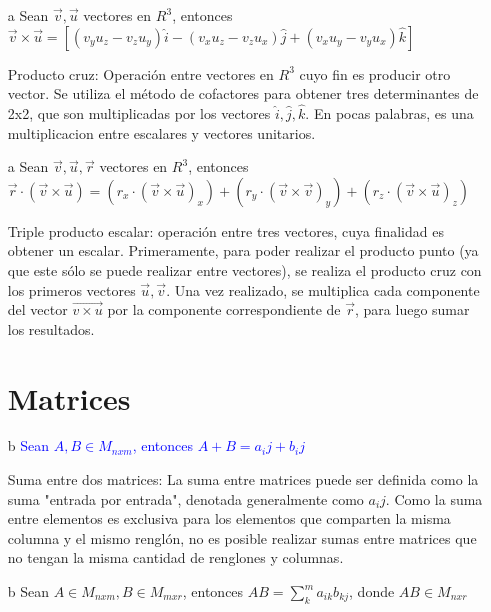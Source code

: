 \documentclass[letterpaper, 12pt]{article}
\begin{document}
\begin{itemize}
    \item[a] Sean $\vec v, \vec u$ vectores en $R^3$, entonces $\vec v \times \vec u = [(v_yu_z - v_zu_y)\hat{i} -(v_xu_z - v_zu_x)\hat{j} + (v_xu_y - v_yu_x)\hat{k}]$ \newline

    Producto cruz: Operaci\'on entre vectores en $R^{3}$ cuyo fin es producir otro vector. Se utiliza el m\'etodo de cofactores para obtener tres determinantes de 2x2, que son multiplicadas por los vectores $\hat i, \hat j, \hat k$. En pocas palabras, es una multiplicacion entre escalares y vectores unitarios. \newline
    
    \item[a] Sean $\vec v, \vec u, \vec r$ vectores en $R^3$, entonces $\vec r \cdot (\vec v \times \vec u) = (r_x \cdot (\vec v \times \vec u)_x) + (r_y \cdot (\vec v \times \vec v)_y) + (r_z \cdot (\vec v \times \vec u)_z)$ \newline

    Triple producto escalar: operaci\'on entre tres vectores, cuya finalidad es obtener un escalar. Primeramente, para poder realizar el producto punto (ya que este s\'olo se puede realizar entre vectores), se realiza el producto cruz con los primeros vectores $\vec u, \vec v$. Una vez realizado, se multiplica cada componente del vector $\vec{v \times u}$ por la componente correspondiente de $\vec r$, para luego sumar los resultados. \newpage

\section{Matrices}
    \item[b] \textcolor{blue}{Sean $A,B \in M_{nxm}$, entonces $A+B = a_ij + b_ij$} \newline
    
    Suma entre dos matrices: La suma entre matrices puede ser definida como la suma "entrada por entrada", denotada generalmente como $a_ij$. Como la suma entre elementos es exclusiva para los elementos que comparten la misma columna y el mismo rengl\'on, no es posible realizar sumas entre matrices que no tengan la misma cantidad de renglones y columnas. \newline
    
    \item[b] Sean $A\in M_{nxm}, B\in M_{mxr}$, entonces $AB = \displaystyle \sum_{k}^{m} a_{ik}b_{kj}$, donde $AB \in M_{nxr}$ \newline


\end{itemize}
\end{document}
